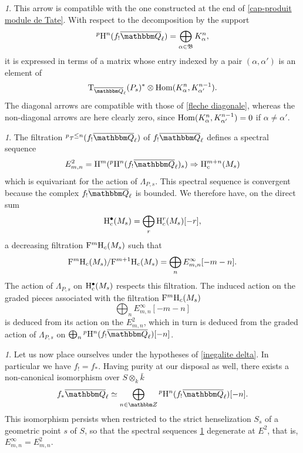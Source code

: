 \documentclass[12pt,english]{smfart}
\numberwithin{equation}{subsection}
\theoremstyle{remark}
\newtheorem{numero}[equation]{}
\newcommand\rmT{{\rm T}}
\newcommand\FrakB{{\mathfrak B}}
\newcommand\ZZ{{\mathbbm Z}}
\newcommand\QQ{{\mathbbm Q}}
\newcommand\rmH{{\rm H}}
\newcommand\Ql{{\overline\QQ_\ell}}
\begin{document}
\begin{numero}\label{compatibilite cap-produit}
This arrow is compatible with the one constructed at the end of \ref{cap-produit module de Tate}. With respect to the decomposition by the support
$${}^p\rmH^n(f_!\Ql)=\bigoplus_{\alpha\in\FrakB} K^n_\alpha,$$
it is expressed in terms of a matrix whose entry indexed by a pair $(\alpha,\alpha')$ is an element of
$$\rmT_\Ql(P_s)^*\otimes {\rm Hom}(K^n_\alpha,K^{n-1}_{\alpha'}).$$
The diagonal arrows are compatible with those of \ref{fleche diagonale}, whereas the non-diagonal arrows are here clearly zero, since ${\rm Hom}(K^n_\alpha,K^{n-1}_{\alpha'})=0$ if $\alpha\not=\alpha'$.
\end{numero}

\begin{numero}\label{suite spectrale}
The filtration ${}^p\tau^{\leq n}(f_!\Ql)$ of $f_!\Ql$ defines a spectral sequence
$$E^2_{m,n}=\rmH^m({}^p\rmH^n(f_!\Ql)_s)\Rightarrow \rmH^{m+n}_c(M_s)$$
which is equivariant for the action of $\Lambda_{P,s}$. This spectral sequence is convergent because the complex $f_!\Ql$ is bounded. We therefore have, on the direct sum
$$\rmH^\bullet_c(M_s)=\bigoplus_r \rmH^r_c(M_s)[-r],$$
a decreasing filtration ${\rm F}^m\rmH_c(M_s)$ such that
$${\rm F}^m\rmH_c(M_s)/{\rm F}^{m+1}\rmH_c(M_s)=\bigoplus_n E^\infty_{m,n}[-m-n].$$
The action of $\Lambda_{P,s}$ on $\rmH^\bullet_c(M_s)$ respects this filtration. The induced action on the graded pieces associated with the filtration ${\rm F}^m\rmH_c(M_s)$
$$\bigoplus_n E^\infty_{m,n}[-m-n]$$
is deduced from its action on the $E^2_{m,n}$, which in turn is deduced from the graded action of $\Lambda_{P,s}$ on $\bigoplus_n {}^p\rmH^n(f_!\Ql)[-n]$.
\end{numero}

\begin{numero}\label{degenerescence E2}
Let us now place ourselves under the hypotheses of \ref{inegalite delta}. In particular we have $f_!=f_*$. Having purity at our disposal as well, there exists a non-canonical isomorphism over $S\otimes_k\bar k$
$$f_*\Ql \simeq \bigoplus_{n\in\ZZ} {}^p\rmH^n(f_!\Ql)[-n].$$
This isomorphism persists when restricted to the strict henselization $S_s$ of a geometric point $s$ of $S$, so that the spectral sequences \ref{suite spectrale} degenerate at $E^2$, that is, $E^\infty_{m,n}=E^2_{m,n}$.
\end{numero}
\end{document}
